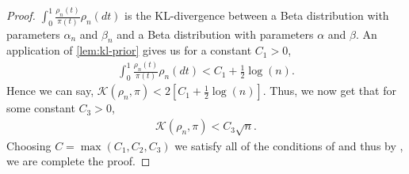 \documentclass[11pt]{amsart}
\begin{document}
\begin{proof}
$\int_0^{1} \frac{\rho_n(t)}{\pi(t)} \rho_n(dt)$ is the KL-divergence between a Beta distribution with parameters $\alpha_n$ and $\beta_n$ and a Beta distribution with parameters $\alpha$ and $\beta$. An application of \cref{lem:kl-prior} gives us for a constant $C_1>0$,
\begin{align*}
    \int_0^{1} \frac{\rho_n(t)}{\pi(t)} \rho_n(dt) < C_1+\frac{1}{2}\log(n).
\end{align*} 
Hence we can say, $  \mathcal{K}(\rho_n,\pi) <2\left[C_1+\frac{1}{2}\log(n)\right]$. Thus, we now get that for some constant $C_3>0$,
\begin{align*}
    \mathcal{K}(\rho_n,\pi) <C_3\sqrt{n}.
\end{align*}
Choosing $C=\max(C_1,C_2,C_3)$ we satisfy all of the conditions of  and thus by , we are complete the proof.
\end{proof}










\end{document}
